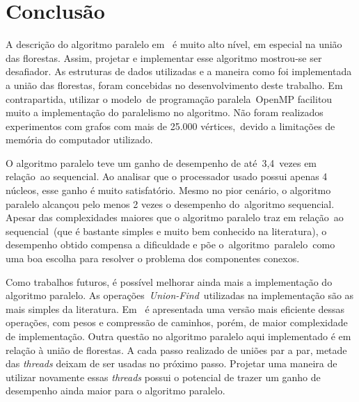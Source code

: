 \documentclass[12pt]{article}
\begin{document}
\section{Conclusão}
\label{conclusao}

A descrição do algoritmo paralelo em~\cite{Grama:2003} é muito alto nível, em especial na união das florestas. Assim, projetar e implementar esse algoritmo mostrou-se ser desafiador. As estruturas de dados utilizadas e a maneira como foi implementada a união das florestas, foram concebidas no desenvolvimento deste trabalho. Em contrapartida, utilizar o modelo de programação paralela OpenMP facilitou muito a implementação do paralelismo no algoritmo. Não foram realizados experimentos com grafos com mais de 25.000 vértices, devido a limitações de memória do computador utilizado.

O algoritmo paralelo teve um ganho de desempenho de até 3,4 vezes em relação ao sequencial. Ao analisar que o processador usado possui apenas 4 núcleos, esse ganho é muito satisfatório. Mesmo no pior cenário, o algoritmo paralelo alcançou pelo menos 2 vezes o desempenho do algoritmo sequencial. Apesar das complexidades maiores que o algoritmo paralelo traz em relação ao sequencial (que é bastante simples e muito bem conhecido na literatura), o desempenho obtido compensa a dificuldade e põe o algoritmo paralelo como uma boa escolha para resolver o problema dos componentes conexos.

Como trabalhos futuros, é possível melhorar ainda mais a implementação do algoritmo paralelo. As operações \emph{Union-Find} utilizadas na implementação são as mais simples da literatura. Em~\cite{Sedgewick:2011} é apresentada uma versão mais eficiente dessas operações, com pesos e compressão de caminhos, porém, de maior complexidade de implementação. Outra questão no algoritmo paralelo aqui implementado é em relação à união de florestas. A cada passo realizado de uniões par a par, metade das \emph{threads} deixam de ser usadas no próximo passo. Projetar uma maneira de utilizar novamente essas \emph{threads} possui o potencial de trazer um ganho de desempenho ainda maior para o algoritmo paralelo.




\end{document}
